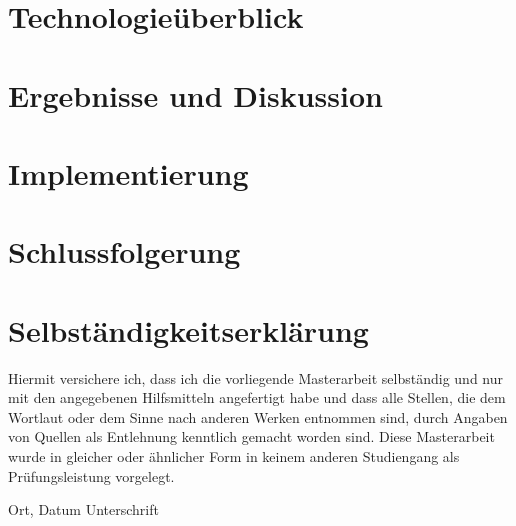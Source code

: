 \documentclass[a4paper,UKenglish,compactauthor]{lipics-v2021}
\begin{document}
\section{Technologieüberblick}
\label{sec:Technologieüberblick}


\section{Ergebnisse und Diskussion}
\label{sec:ergebnisse}


\section{Implementierung}
\label{sec:Implementierung}


\section{Schlussfolgerung}
\label{sec:Schlussfolgerung}



\cleardoublepage



\cleardoublepage
\thispagestyle{empty}
\section*{Selbständigkeitserklärung}

Hiermit versichere ich, dass ich die vorliegende Masterarbeit
selbständig und nur mit den angegebenen Hilfsmitteln angefertigt habe und dass alle Stellen, die dem Wortlaut oder dem
Sinne nach anderen Werken entnommen sind, durch Angaben von Quellen als
Entlehnung kenntlich gemacht worden sind.
Diese Masterarbeit wurde in gleicher oder ähnlicher Form in keinem anderen
Studiengang als Prüfungsleistung vorgelegt.

\vskip 3cm

Ort, Datum	\hfill Unterschrift \hfill
\end{document}
